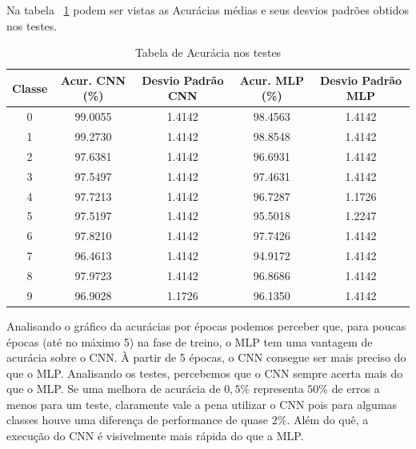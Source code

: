 \documentclass[12pt, a4paper, brazil, portuguese]{article}
\begin{document}
Na tabela ~\ref{tab:testes_um} podem ser vistas as Acurácias médias e seus desvios padrões obtidos
nos testes.
\begin{table}
  \begin{tabular}{ c c  c  c  c }
    Classe & Acur. CNN (\%) & Desvio Padrão CNN & Acur. MLP (\%) & Desvio Padrão MLP \\
    \hline
    0 & 99.0055 & 1.4142 & 98.4563 & 1.4142 \\
    1 & 99.2730 & 1.4142 & 98.8548 & 1.4142 \\
    2 & 97.6381 & 1.4142 & 96.6931 & 1.4142 \\
    3 & 97.5497 & 1.4142 & 97.4631 & 1.4142 \\
    4 & 97.7213 & 1.4142 & 96.7287 & 1.1726 \\
    5 & 97.5197 & 1.4142 & 95.5018 & 1.2247 \\
    6 & 97.8210 & 1.4142 & 97.7426 & 1.4142 \\
    7 & 96.4613 & 1.4142 & 94.9172 & 1.4142 \\
    8 & 97.9723 & 1.4142 & 96.8686 & 1.4142 \\
    9 & 96.9028 & 1.1726 & 96.1350 & 1.4142 \\
  \end{tabular}
  \caption{Tabela de Acurácia nos testes}
  \label{tab:testes_um}
\end{table}

Analisando o gráfico da acurácias por épocas podemos perceber que, para poucas épocas (até no máximo
5) na fase de treino, o MLP tem uma vantagem de acurácia sobre o CNN. À partir de 5 épocas, o CNN
consegue ser mais preciso do que o MLP. Analisando os testes, percebemos que o CNN sempre acerta
mais do que o MLP. Se uma melhora de acurácia de $0,5\%$ representa $50\%$ de erros a menos para um
teste, claramente vale a pena utilizar o CNN pois para algumas classes houve uma diferença de
performance de quase $2\%$. Além do quê, a execução do CNN é visivelmente mais rápida do que a MLP.

\end{document}

